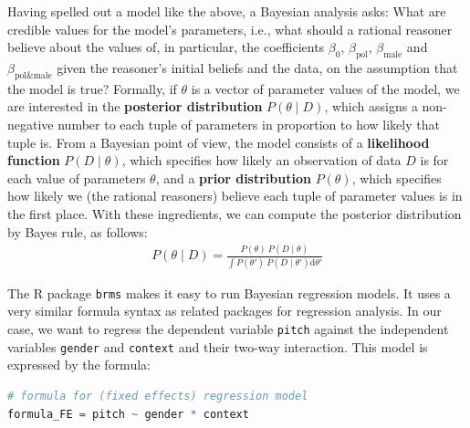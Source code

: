 \documentclass[nobib]{tufte-handout}
\begin{document}
Having spelled out a model like the above, a Bayesian analysis asks: What are credible values for the model's parameters, i.e., what should a rational reasoner believe about the values of,
in particular, the coefficients $\beta_0$, $\beta_{\text{pol}}$, $\beta_{\text{male}}$ and $\beta_{\text{pol\&male}}$ given the reasoner's initial beliefs and the data, on the assumption that the model is true?
%
%
Formally, if $\theta$ is a vector of parameter values of the model, we are interested in the \textbf{posterior distribution} $P(\theta \mid D)$, which assigns a non-negative number to each tuple of parameters in proportion to how likely that tuple is.
From a Bayesian point of view, the model consists of a \textbf{likelihood function} $P(D \mid \theta)$, which specifies how likely an observation of data $D$ is for each value of parameters $\theta$, and a \textbf{prior distribution} $P(\theta)$, which specifies how likely we (the rational reasoners) believe each tuple of parameter values is in the first place.
%
%
With these ingredients, we can compute the posterior distribution by Bayes rule, as follows:
\begin{eqnarray*}
  P(\theta \mid D) = \frac{P(\theta) \ P(D \mid \theta)}{ \int P(\theta') \ P(D \mid
  \theta') \textrm{d}\theta'}
\end{eqnarray*}

The R package \texttt{brms} \citep{buerkner2016brms} makes it easy to run Bayesian regression models. It uses a very similar formula syntax as related packages for regression analysis. In our case, we want to regress the dependent variable \texttt{pitch} against the independent variables \texttt{gender} and \texttt{context} and their two-way interaction. This model is expressed by the formula:

\bigskip

\begin{minipage}[]{\textwidth}
\begin{lstlisting}[language=R]
# formula for (fixed effects) regression model
formula_FE = pitch ~ gender * context
\end{lstlisting}
\end{minipage}
\end{document}
